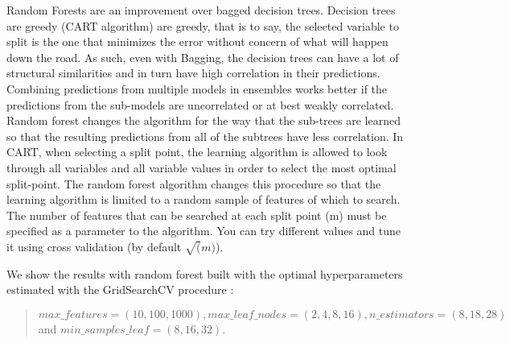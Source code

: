 \documentclass[11pt]{article}
\theoremstyle{definition}
\theoremstyle{remark}
\begin{document}
Random Forests are an improvement over bagged decision trees. Decision trees are greedy (CART algorithm) are greedy, that is to say, the selected variable to split is the one that minimizes the error without concern of what will happen down the road. As such, even with Bagging, the decision trees can have a lot of structural similarities and in turn have high correlation in their predictions. Combining predictions from multiple models in ensembles works better if the predictions from the sub-models are uncorrelated or at best weakly correlated.
Random forest changes the algorithm for the way that the sub-trees are learned so that the resulting predictions from all of the subtrees have less correlation. In CART, when selecting a split point, the learning algorithm is allowed to look through all variables and all variable values in order to select the most optimal split-point. The random forest algorithm changes this procedure so that the learning algorithm is limited to a random sample of features of which to search. The number of features that can be searched at each split point (m) must be specified as a parameter to the algorithm. You can try different values and tune it using cross validation (by default $\sqrt(m)$).

We show the results with random forest built with the optimal hyperparameters estimated with the GridSearchCV procedure
: 
\begin{quote}
$max\_features=(10,100,1000), max\_leaf\_nodes=(2,4,8,16), n\_estimators=(8,18,28)$ and  $min\_samples\_leaf=(8,16,32)$.
\end{quote}
\end{document}
